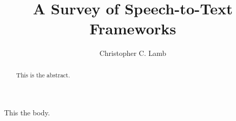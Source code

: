 \documentclass[12pt,letterpaper]{article}
\author{Christopher C. Lamb}
\title{A Survey of Speech-to-Text Frameworks}
\begin{document}
\maketitle

\begin{abstract}
This is the abstract.
\end{abstract}
This the body.
\end{document}
